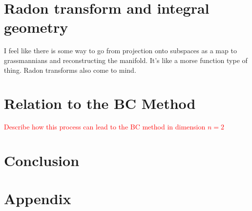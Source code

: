 \documentclass[12pt]{article}
\begin{document}
\section{Radon transform and integral geometry}

I feel like there is some way to go from projection onto subspaces as a map to grassmannians and reconstructing the manifold.  It's like a morse function type of thing.  Radon transforms also come to mind.

\section{Relation to the BC Method}

\textcolor{red}{Describe how this process can lead to the BC method in dimension $n=2$}


\section{Conclusion}


\appendix
\section{Appendix}




\end{document}
